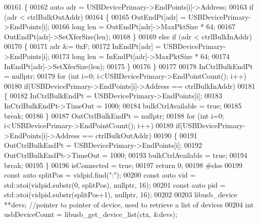 \begin{DoxyCode}
00161     \{
00162         \textcolor{keyword}{auto} adr = USBDevicePrimary->EndPoints[i]->Address;
00163         \textcolor{keywordflow}{if} (adr < ctrlBulkOutAddr)
00164         \{
00165             OutEndPt[adr] = USBDevicePrimary->EndPoints[i];
00166             \textcolor{keywordtype}{long} len = OutEndPt[adr]->MaxPktSize * 64;
00167             OutEndPt[adr]->SetXferSize(len);
00168         \}
00169         \textcolor{keywordflow}{else} \textcolor{keywordflow}{if} (adr < ctrlBulkInAddr)
00170         \{
00171             adr &= 0xF;
00172             InEndPt[adr] = USBDevicePrimary->EndPoints[i];
00173             \textcolor{keywordtype}{long} len = InEndPt[adr]->MaxPktSize * 64;
00174             InEndPt[adr]->SetXferSize(len);
00175         \}
00176     \}
00177 
00178     InCtrlBulkEndPt = \textcolor{keyword}{nullptr};
00179     \textcolor{keywordflow}{for} (\textcolor{keywordtype}{int} i=0; i<USBDevicePrimary->EndPointCount(); i++)
00180         \textcolor{keywordflow}{if}(USBDevicePrimary->EndPoints[i]->Address == ctrlBulkInAddr)
00181         \{
00182             InCtrlBulkEndPt = USBDevicePrimary->EndPoints[i];
00183             InCtrlBulkEndPt->TimeOut = 1000;
00184             bulkCtrlAvailable = \textcolor{keyword}{true};
00185             \textcolor{keywordflow}{break};
00186         \}
00187     OutCtrlBulkEndPt = \textcolor{keyword}{nullptr};
00188     \textcolor{keywordflow}{for} (\textcolor{keywordtype}{int} i=0; i<USBDevicePrimary->EndPointCount(); i++)
00189         \textcolor{keywordflow}{if}(USBDevicePrimary->EndPoints[i]->Address == ctrlBulkOutAddr)
00190         \{
00191             OutCtrlBulkEndPt = USBDevicePrimary->EndPoints[i];
00192             OutCtrlBulkEndPt->TimeOut = 1000;
00193             bulkCtrlAvailable = \textcolor{keyword}{true};
00194             \textcolor{keywordflow}{break};
00195         \}
00196     isConnected = \textcolor{keyword}{true};
00197     \textcolor{keywordflow}{return} 0;
00198 \textcolor{preprocessor}{#else}
00199     \textcolor{keyword}{const} \textcolor{keyword}{auto} splitPos = vidpid.find(\textcolor{stringliteral}{":"});
00200     \textcolor{keyword}{const} \textcolor{keyword}{auto} vid = std::stoi(vidpid.substr(0, splitPos), \textcolor{keyword}{nullptr}, 16);
00201     \textcolor{keyword}{const} \textcolor{keyword}{auto} pid = std::stoi(vidpid.substr(splitPos+1), \textcolor{keyword}{nullptr}, 16);
00202 
00203     libusb\_device **devs; \textcolor{comment}{//pointer to pointer of device, used to retrieve a list of devices}
00204     \textcolor{keywordtype}{int} usbDeviceCount = libusb\_get\_device\_list(ctx, &devs);

\end{DoxyCode}
